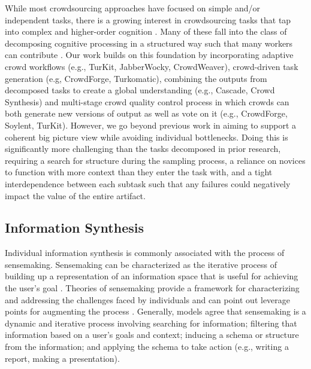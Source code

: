 While most crowdsourcing approaches have focused on simple and/or independent tasks, there is a growing interest in crowdsourcing tasks that tap into complex and higher-order cognition \cite{kittur2013future}. Many of these fall into the class of decomposing cognitive processing in a structured way such that many workers can contribute \cite{ahmad2011jabberwocky, bernstein2010soylent, bigham2010vizwiz, kim2014crowdsourcing, kittur2011crowdforge, Kittur:2012:CVM:2145204.2145357, kulkarni2011turkomatic, lasecki2013warping, lasecki2013legion, little2010turkit}. Our work builds on this foundation by incorporating adaptive crowd workflows (e.g., TurKit, JabberWocky, CrowdWeaver), crowd-driven task generation (e.g, CrowdForge, Turkomatic), combining the outputs from decomposed tasks to create a global understanding (e.g., Cascade, Crowd Synthesis) and multi-stage crowd quality control process in which crowds can both generate new versions of output as well as vote on it (e.g., CrowdForge, Soylent, TurKit). However, we go beyond previous work in aiming to support a coherent big picture view while avoiding individual bottlenecks. Doing this is significantly more challenging than the tasks decomposed in prior research, requiring a search for structure during the sampling process, a reliance on novices to function with more context than they enter the task with, and a tight interdependence between each subtask such that any failures could negatively impact the value of the entire artifact. 

\vfill
\subsection{Information Synthesis}

Individual information synthesis is commonly associated with the process of sensemaking. Sensemaking can be characterized as the iterative process of building up a representation of an information space that is useful for achieving the user’s goal \cite{Russell:1993:CSS:169059.169209}. Theories of sensemaking provide a framework for characterizing and addressing the challenges faced by individuals and can point out leverage points for augmenting the process \cite{Russell:1993:CSS:169059.169209,dervin1983overview,klein2006making,karl1995sensemaking, gioia1991sensemaking,daft1984toward,milliken1990perceiving,pirolli1999information}. Generally, models agree that sensemaking is a dynamic and iterative process involving searching for information; filtering that information based on a user's goals and context; inducing a schema or structure from the information; and applying the schema to take action (e.g., writing a report, making a presentation).


